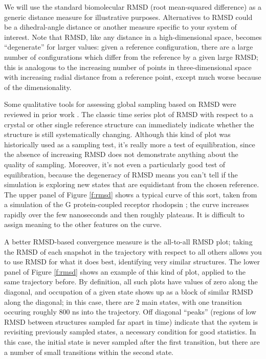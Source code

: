 We will use the standard biomolecular RMSD (root mean-squared difference) as a generic distance measure for illustrative purposes.
Alternatives to RMSD could be a dihedral-angle distance or another measure specific to your system of interest.
Note that RMSD, like any distance in a high-dimensional space, becomes ``degenerate'' for larger values: given a reference configuration, there are a large number of configurations which differ from the reference by a given large RMSD; this is analogous to the increasing number of points in three-dimensional space with increasing radial distance from a reference point, except much worse because of the dimensionality.

Some qualitative tools for assessing global sampling based on RMSD were reviewed
in prior work \cite{Grossfield2009}.   The classic time series plot of RMSD with
respect to a crystal or other single reference structure can immediately
indicate whether the structure is still systematically changing.  Although this
kind of plot was historically used as a sampling test, it's really more a test
of equilibration, since the absence of increasing RMSD does not demonstrate
anything about the quality of sampling.  Moreover, it's not even a particularly
good test of equilibration, because the degeneracy of RMSD means you can't tell
if the simulation is exploring new states that are equidistant from the chosen
reference.  The upper panel of Figure \ref{f:rmsd} shows a typical curve of this
sort, taken from a simulation of the G protein-coupled receptor rhodopsin
\cite{Grossfield-2015}; the curve increases rapidly over the few nanoseconds and
then roughly plateaus.  It is difficult to assign meaning to the other features
on the curve.

A better RMSD-based convergence measure is the all-to-all RMSD plot; taking the
RMSD of each snapshot in the trajectory with respect to all others allows you to
use RMSD for what it does best, identifying very similar structures.  The lower
panel of Figure \ref{f:rmsd} shows an example of this kind of plot, applied to
the same trajectory before.  By definition, all such plots have values of zero
along the diagonal, and occupation of a given state shows up as a block of
similar RMSD along the diagonal; in this case, there are 2 main states, with one
transition occuring roughly 800 ns into the trajectory.  Off diagonal ``peaks''
(regions of low RMSD between structures sampled far apart in time) indicate that
the system is revisiting previously sampled states, a necessary condition for
good statistics.  In this case, the initial state is never sampled after the
first transition, but there are a number of small transitions within the second
state.
